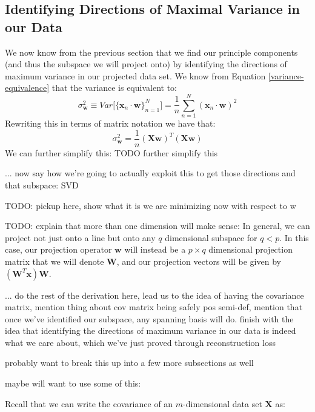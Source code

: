 \subsection{Identifying Directions of Maximal Variance in our Data}
We now know from the previous section that we find our principle components (and thus the subspace we will project onto) by identifying the directions of maximum variance in our projected data set. We know from Equation \ref{variance-equivalence} that the variance is equivalent to:
\begin{equation*}
    \sigma^{2}_{\textbf{w}} \equiv Var\big[\{\textbf{x}_{n} \cdot \textbf{w}\}_{n=1}^{N}\big] = \frac{1}{n} \sum_{n=1}^{N} (\textbf{x}_{n} \cdot \textbf{w})^{2}
\end{equation*}
Rewriting this in terms of matrix notation we have that:
\begin{equation*}
    \sigma^{2}_{\textbf{w}} = \frac{1}{n} (\textbf{X} \textbf{w})^{T} (\textbf{X} \textbf{w})
\end{equation*}
We can further simplify this: TODO further simplify this

\newpage

... now say how we're going to actually exploit this to get those directions and that subspace: SVD

TODO: pickup here, show what it is we are minimizing now with respect to w


TODO: explain that more than one dimension will make sense:
In general, we can project not just onto a line but onto any $q$ dimensional subspace for $q < p$. In this case, our projection operator $\textbf{w}$ will instead be a $p \times q$ dimensional projection matrix that we will denote $\textbf{W}$, and our projection vectors will be given by $(\textbf{W}^{T}\textbf{x})\textbf{W}$.

... do the rest of the derivation here, lead us to the idea of having the covariance matrix, mention thing about cov matrix being safely pos semi-def, mention that once we've identified our subspace, any spanning basis will do. finish with the idea that identifying the directions of maximum variance in our data is indeed what we care about, which we've just proved through reconstruction loss

probably want to break this up into a few more subsections as well

maybe will want to use some of this:

Recall that we can write the covariance of an $m$-dimensional data set $\textbf{X}$ as:

